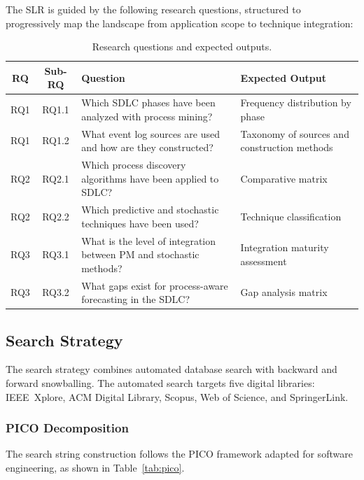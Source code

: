 The SLR is guided by the following research questions, structured to
progressively map the landscape from application scope to technique
integration:

\begin{table}[htbp]
\centering
\caption{Research questions and expected outputs.}
\label{tab:slr-rqs}
\small
\setlength{\tabcolsep}{4pt}
\begin{tabular}{c c p{7.1cm} p{3.8cm}}
\toprule
\textbf{RQ} & \textbf{Sub-RQ} & \textbf{Question} & \textbf{Expected Output} \\
\midrule
RQ1 & RQ1.1 & Which SDLC phases have been analyzed with process mining? &
  Frequency distribution by phase \\
RQ1 & RQ1.2 & What event log sources are used and how are they constructed? &
  Taxonomy of sources and construction methods \\
\midrule
RQ2 & RQ2.1 & Which process discovery algorithms have been applied to SDLC? &
  Comparative matrix \\
RQ2 & RQ2.2 & Which predictive and stochastic techniques have been used? &
  Technique classification \\
\midrule
RQ3 & RQ3.1 & What is the level of integration between PM and stochastic
  methods? & Integration maturity assessment \\
RQ3 & RQ3.2 & What gaps exist for process-aware forecasting in the SDLC? &
  Gap analysis matrix \\
\bottomrule
\end{tabular}
\end{table}


\subsection{Search Strategy}
\label{sec:slr-search}

The search strategy combines automated database search with backward and
forward snowballing. The automated search targets five digital libraries:
IEEE~Xplore, ACM Digital Library, Scopus, Web of Science, and SpringerLink.

\subsubsection{PICO Decomposition}

The search string construction follows the PICO framework adapted for
software engineering, as shown in Table~\ref{tab:pico}.

